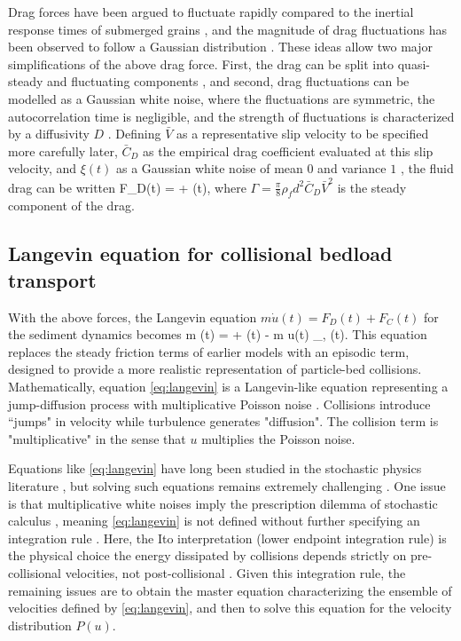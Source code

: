 Drag forces have been argued to fluctuate rapidly compared to the inertial response times of submerged grains \citep{Fan2014}, and the magnitude of drag fluctuations has been observed to follow a Gaussian distribution \citep{Hofland2006,Schmeeckle2007,Dwivedi2010,Celik2014}.
These ideas allow two major simplifications of the above drag force.
First, the drag can be split into quasi-steady and fluctuating components \citep{Michaelides1997}, and second, drag fluctuations can be modelled as a Gaussian white noise, where the fluctuations are symmetric, the autocorrelation time is negligible, and the strength of fluctuations is characterized by a diffusivity $D$ \citep{Fan2014,Ancey2014}. 
Defining $\bar{V}$ as a representative slip velocity to be specified more carefully later,  $\bar{C}_D$ as the empirical drag coefficient evaluated at this slip velocity, and $\xi(t)$ as a Gaussian white noise of mean $0$ and variance $1$ \citep{Gardiner1983}, the fluid drag can be written
\be F_D(t) = \Gamma +  \eta(t), \label{eq:drag}\ee
where $\Gamma = \frac{\pi}{8}
\rho_f d^2 \bar{C}_D \bar{V}^2$ is the steady component of the drag.

\subsection{Langevin equation for collisional bedload transport}

With the above forces, the Langevin equation $m\dot{u}(t) = F_D(t) + F_C(t)$ for the sediment dynamics becomes
\be m (t) = \Gamma + \eta(t) - m u(t) \xi_{\nu, \ve}(t). \label{eq:langevin} \ee
This equation replaces the steady friction terms of earlier models with an episodic term, designed to provide a more realistic representation of particle-bed collisions.
Mathematically, equation \ref{eq:langevin} is a Langevin-like equation representing a jump-diffusion process \citep{Daly2006} with multiplicative Poisson noise \citep{Dubkov2016,Denisov2009}. 
Collisions introduce ``jumps" in velocity while turbulence generates "diffusion". The collision term is "multiplicative" in the sense that $u$ multiplies the Poisson noise.

Equations like \ref{eq:langevin} have long been studied in the stochastic physics literature \citep{Hanggi1978,VanDenBroeck1983}, but solving such equations remains extremely challenging \citep{Daly2010,Mau2014,Dubkov2019}.
One issue is that multiplicative white noises imply the prescription dilemma of stochastic calculus \citep{Risken1989,Gardiner1983}, meaning \ref{eq:langevin} is not defined without further specifying an integration rule \citep{Suweis2011}.
Here, the Ito interpretation (lower endpoint integration rule) is the physical choice the energy dissipated by collisions depends strictly on pre-collisional velocities, not post-collisional \citep[e.g.][]{Gardiner1983}.
Given this integration rule, the remaining issues are to obtain the master equation characterizing the ensemble of velocities defined by \ref{eq:langevin}, and then to solve this equation for the velocity distribution $P(u)$.


